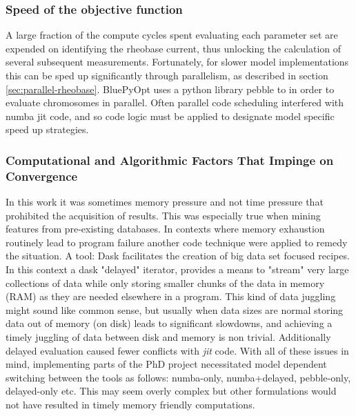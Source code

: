 \subsubsection{Speed of the objective function}
A large fraction of the compute cycles spent evaluating each parameter set are expended on identifying the rheobase current, thus unlocking the calculation of several subsequent measurements.
Fortunately, for slower model implementations this can be sped up significantly through parallelism, as described in section \ref{sec:parallel-rheobase}. BluePyOpt uses a python library pebble to in order to evaluate chromosomes in parallel. Often parallel code scheduling interfered with numba jit code, and so code logic must be applied to designate model specific speed up strategies. 

\subsubsection{Computational and Algorithmic Factors That Impinge on Convergence}


In this work it was sometimes memory pressure and not time pressure that prohibited the acquisition of results. This was especially true when mining features from pre-existing databases. In contexts where memory exhaustion routinely lead to program failure another code technique were applied to remedy the situation. A tool: Dask \cite{rocklin2015dask} facilitates the creation of big data set focused recipes. In this context a dask "delayed" iterator, provides a means to "stream" very large collections of data while only storing smaller chunks of the data in memory (RAM) as they are needed elsewhere in a program. This kind of data juggling might sound like common sense, but usually when data sizes are normal storing data out of memory (on disk) leads to significant slowdowns, and achieving a timely juggling of data between disk and memory is non trivial. %
Additionally delayed evaluation caused fewer conflicts with \emph{jit} code. With all of these issues in mind, implementing parts of the PhD project necessitated model dependent switching between the tools as follows: numba-only, numba+delayed, pebble-only, delayed-only etc. This may seem overly complex but other formulations would not have resulted in timely memory friendly computations.


